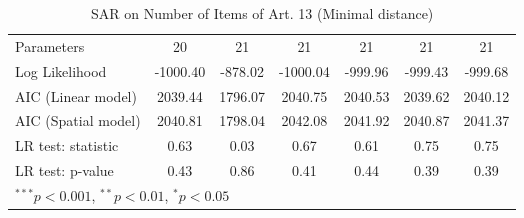 \begin{table}[!h]
\begin{center}
\begin{tabular}{l c c c c c c }
Parameters              & 20           & 21           & 21           & 21           & 21           & 21           \\
Log Likelihood          & -1000.40     & -878.02      & -1000.04     & -999.96      & -999.43      & -999.68      \\
AIC (Linear model)      & 2039.44      & 1796.07      & 2040.75      & 2040.53      & 2039.62      & 2040.12      \\
AIC (Spatial model)     & 2040.81      & 1798.04      & 2042.08      & 2041.92      & 2040.87      & 2041.37      \\
LR test: statistic      & 0.63         & 0.03         & 0.67         & 0.61         & 0.75         & 0.75         \\
LR test: p-value        & 0.43         & 0.86         & 0.41         & 0.44         & 0.39         & 0.39         \\
\bottomrule
\multicolumn{7}{l}{\scriptsize{$^{***}p<0.001$, $^{**}p<0.01$, $^*p<0.05$}}
\end{tabular}
\caption{SAR on Number of Items of Art. 13 (Minimal distance)}
\label{table:coefficients}
\end{center}
\end{table}
